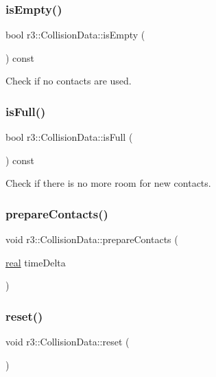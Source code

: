 \subsubsection{\texorpdfstring{is\+Empty()}{isEmpty()}}
{\footnotesize\ttfamily bool r3\+::\+Collision\+Data\+::is\+Empty (\begin{DoxyParamCaption}{ }\end{DoxyParamCaption}) const}

Check if no contacts are used. \mbox{\label{classr3_1_1_collision_data_aebb099e77b79235942a9c0166eb66a78}} 
\subsubsection{\texorpdfstring{is\+Full()}{isFull()}}
{\footnotesize\ttfamily bool r3\+::\+Collision\+Data\+::is\+Full (\begin{DoxyParamCaption}{ }\end{DoxyParamCaption}) const}

Check if there is no more room for new contacts. \mbox{\label{classr3_1_1_collision_data_a7a8dcf7d0b2cdd99d9c96dabc2a4fbc9}} 
\subsubsection{\texorpdfstring{prepare\+Contacts()}{prepareContacts()}}
{\footnotesize\ttfamily void r3\+::\+Collision\+Data\+::prepare\+Contacts (\begin{DoxyParamCaption}\item[{\mbox{\hyperlink{namespacer3_ab2016b3e3f743fb735afce242f0dc1eb}{real}}}]{time\+Delta }\end{DoxyParamCaption})}

\mbox{\label{classr3_1_1_collision_data_af74822ca6881f5ab54447a73ac26d7fd}} 
\subsubsection{\texorpdfstring{reset()}{reset()}}
{\footnotesize\ttfamily void r3\+::\+Collision\+Data\+::reset (\begin{DoxyParamCaption}{ }\end{DoxyParamCaption})}



